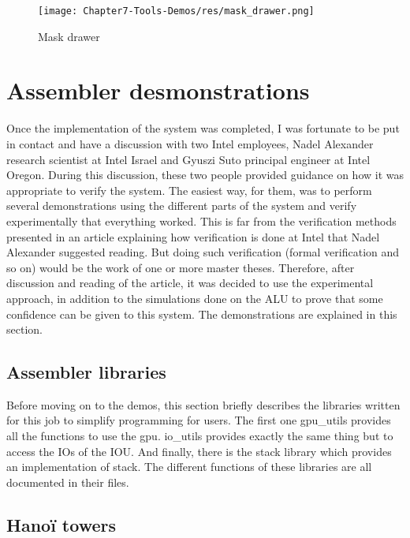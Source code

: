 \begin{figure}[H]
    \centering
    \texttt{[image: Chapter7-Tools-Demos/res/mask\_drawer.png]}
    \caption{Mask drawer}
    \label{fig:tools/mask_drawer}
\end{figure}

\section{Assembler desmonstrations}

Once the implementation of the system was completed, I was fortunate to be put in contact and have 
a discussion with two Intel employees, Nadel Alexander research scientist at Intel Israel and 
Gyuszi Suto principal engineer at Intel Oregon. During this discussion, these two people provided 
guidance on how it was appropriate to verify the system. The easiest way, for them, was to perform 
several demonstrations using the different parts of the system and verify experimentally that 
everything worked. This is far from the verification methods presented in an article 
explaining how verification is done at Intel that Nadel Alexander suggested reading. But doing such 
verification (formal verification and so on) would be the work of one or more master theses. 
Therefore, after discussion and reading of the article, it was decided to use the experimental 
approach, in addition to the simulations done on the ALU to prove that some confidence can be given 
to this system. The demonstrations are explained in this section.

\subsection{Assembler libraries}

Before moving on to the demos, this section briefly describes the libraries written for this job to 
simplify programming for users. The first one gpu\_utils provides all the functions to use the gpu. 
io\_utils provides exactly the same thing but to access the IOs of the IOU. And finally, there is 
the stack library which provides an implementation of stack. The different functions of these 
libraries are all documented in their files.

\subsection{Hanoï towers}

